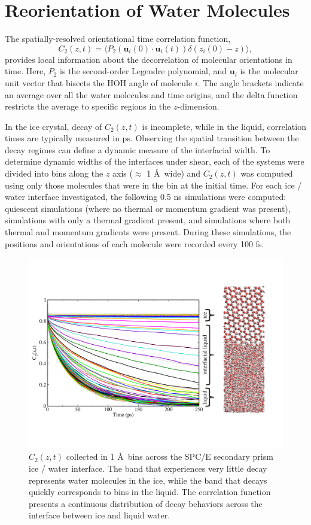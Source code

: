 \section{Reorientation of Water Molecules}
The spatially-resolved orientational time correlation function,
\begin{equation}\label{C(t)1}
  C_{2}(z,t)=\langle P_{2}(\mathbf{u}_i(0)\cdot \mathbf{u}_i(t))
  \delta(z_i(0) - z) \rangle,
\end{equation}
provides local information about the decorrelation of molecular
orientations in time. Here, $P_{2}$ is the second-order Legendre
polynomial, and $\mathbf{u}_i$ is the molecular unit vector that bisects
the HOH angle of molecule $i$. The angle brackets indicate an average
over all the water molecules and time origins, and the delta function
restricts the average to specific regions in the $z$-dimension. 

In the ice crystal, decay of $C_2(z,t)$ is incomplete, while in the
liquid, correlation times are typically measured in ps. Observing the
spatial transition between the decay regimes can define a dynamic
measure of the interfacial width. To determine dynamic widths of the
interfaces under shear, each of the systems were divided into bins
along the $z$ axis ($\approx$ 1 \AA\ wide) and $C_2(z,t)$ was computed
using only those molecules that were in the bin at the initial
time. For each ice / water interface investigated, the following 0.5
ns simulations were computed: quiescent simulations (where no thermal
or momentum gradient was present), simulations with only a thermal
gradient present, and simulations where both thermal and momentum
gradients were present. During these simulations, the positions and
orientations of each molecule were recorded every 100 fs.

\begin{figure}
\includegraphics[width=\linewidth]{Figures/CztImage}
\caption{\label{fig:Czt} $C_2(z,t)$ collected in 1 \AA~bins across the SPC/E
  secondary prism ice / water interface. The band that experiences very
  little decay represents water molecules in the ice, while the band
  that decays quickly corresponds to bins in the liquid.  The
  correlation function presents a continuous distribution of decay
  behaviors across the interface between ice and liquid water.}
\end{figure}


